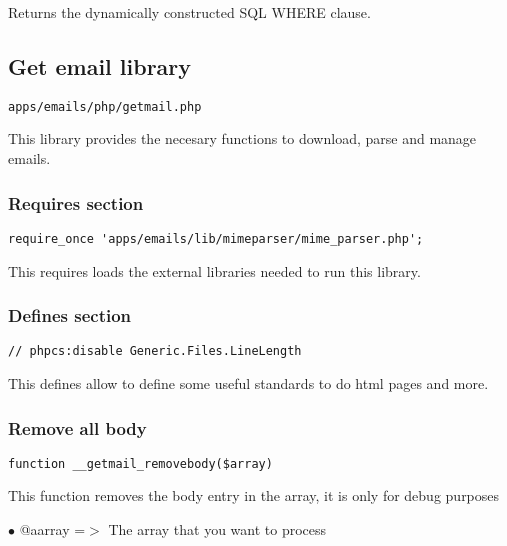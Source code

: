 \documentclass[a4paper]{article}
\begin{document}
Returns the dynamically constructed SQL WHERE clause.

\hypertarget{toc82}{}
\subsection{Get email library}

\begin{lstlisting}
apps/emails/php/getmail.php
\end{lstlisting}

This library provides the necesary functions to download, parse and manage emails.

\hypertarget{toc83}{}
\subsubsection{Requires section}

\begin{lstlisting}
require_once 'apps/emails/lib/mimeparser/mime_parser.php';
\end{lstlisting}

This requires loads the external libraries needed to run this library.

\hypertarget{toc84}{}
\subsubsection{Defines section}

\begin{lstlisting}
// phpcs:disable Generic.Files.LineLength
\end{lstlisting}

This defines allow to define some useful standards to do html pages and more.

\hypertarget{toc85}{}
\subsubsection{Remove all body}

\begin{lstlisting}
function __getmail_removebody($array)
\end{lstlisting}

This function removes the body entry in the array, it is only for debug purposes

\begin{compactitem}
\item[\color{myblue}$\bullet$] @aarray =$>$ The array that you want to process
\end{compactitem}
\end{document}
